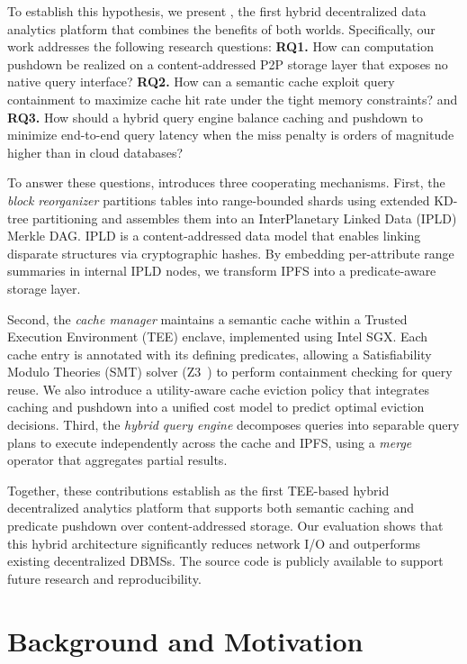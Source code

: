 To establish this hypothesis, we present \ours{}, the first hybrid decentralized data analytics platform that combines the benefits of both worlds. Specifically, our work addresses the following research questions: \textbf{RQ1.} How can computation pushdown be realized on a content-addressed P2P storage layer that exposes no native query interface? \textbf{RQ2.} How can a semantic cache exploit query containment to maximize cache hit rate under the tight memory constraints? and \textbf{RQ3.} How should a hybrid query engine balance caching and pushdown to minimize end-to-end query latency when the miss penalty is orders of magnitude higher than in cloud databases?

To answer these questions, \ours{} introduces three cooperating mechanisms. First, the \textit{block reorganizer} partitions tables into range-bounded shards using extended KD-tree partitioning and assembles them into an InterPlanetary Linked Data (IPLD) Merkle DAG\cite{ipld2023spec}. IPLD is a content-addressed data model that enables linking disparate structures via cryptographic hashes. By embedding per-attribute range summaries in internal IPLD nodes, we transform IPFS into a predicate-aware storage layer.

Second, the \textit{cache manager} maintains a semantic cache within a Trusted Execution Environment (TEE) enclave, implemented using Intel SGX\cite{costan2016intel}. Each cache entry is annotated with its defining predicates, allowing a Satisfiability Modulo Theories (SMT) solver (Z3~\cite{de2008z3}) to perform containment checking for query reuse. We also introduce a utility-aware cache eviction policy that integrates caching and pushdown into a unified cost model to predict optimal eviction decisions. Third, the \textit{hybrid query engine} decomposes queries into separable query plans to execute independently across the cache and IPFS, using a \textit{merge} operator that aggregates partial results.

Together, these contributions establish \ours{} as the first TEE-based hybrid decentralized analytics platform that supports both semantic caching and predicate pushdown over content-addressed storage. Our evaluation shows that this hybrid architecture significantly reduces network I/O and outperforms existing decentralized DBMSs. The source code is publicly available to support future research and reproducibility.

\section{Background and Motivation}
 
